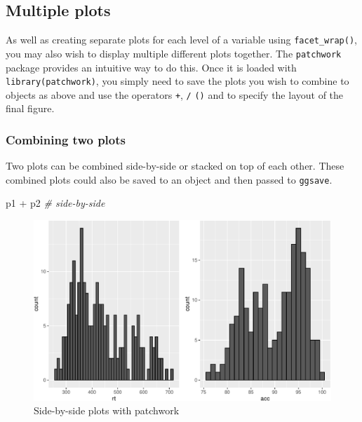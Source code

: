 \documentclass[
  english,
  doc,floatsintext]{apa6}
\newenvironment{Shaded}{\begin{snugshade}}{\end{snugshade}}
\newcommand{\CommentTok}[1]{\textcolor[rgb]{0.56,0.35,0.01}{\textit{#1}}}
\newcommand{\NormalTok}[1]{#1}
\newcommand{\SpecialCharTok}[1]{\textcolor[rgb]{0.00,0.00,0.00}{#1}}
\begin{document}
\hypertarget{multiple-plots}{%
\subsection{Multiple plots}\label{multiple-plots}}

As well as creating separate plots for each level of a variable using \texttt{facet\_wrap()}, you may also wish to display multiple different plots together. The \texttt{patchwork} package provides an intuitive way to do this. Once it is loaded with \texttt{library(patchwork)}, you simply need to save the plots you wish to combine to objects as above and use the operators \texttt{+}, \texttt{/} \texttt{()} and \texttt{\textbar{}} to specify the layout of the final figure.

\hypertarget{combining-two-plots}{%
\subsubsection{Combining two plots}\label{combining-two-plots}}

Two plots can be combined side-by-side or stacked on top of each other. These combined plots could also be saved to an object and then passed to \texttt{ggsave}.

\begin{Shaded}
\begin{Highlighting}[]
\NormalTok{p1 }\SpecialCharTok{+}\NormalTok{ p2 }\CommentTok{\# side{-}by{-}side}
\end{Highlighting}
\end{Shaded}

\begin{figure}

{\centering \includegraphics[width=1\linewidth]{images/patchwork-side-1} 

}

\caption{Side-by-side plots with patchwork}\label{fig:patchwork-side}
\end{figure}
\end{document}
